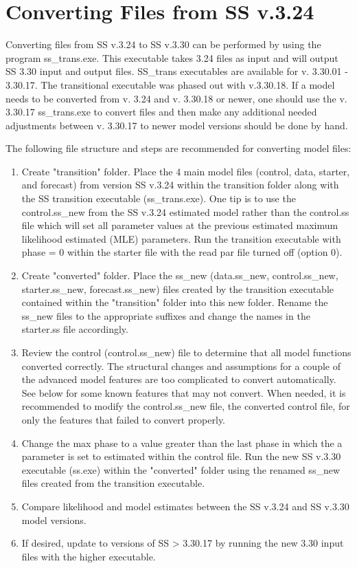 \hypertarget{ConvIssues}{}
\section{Converting Files from SS v.3.24}
Converting files from SS v.3.24 to SS v.3.30 can be performed by using the program ss\_trans.exe. This executable takes 3.24 files as input and will output SS 3.30 input and output files. SS\_trans executables are available for v. 3.30.01 - 3.30.17. The transitional executable was phased out with v.3.30.18. If a model needs to be converted from v. 3.24 and v. 3.30.18 or newer, one should use the v. 3.30.17 ss\_trans.exe to convert files and then make any additional needed adjustments between v. 3.30.17 to newer model versions should be done by hand.  

The following file structure and steps are recommended for converting model files:
\begin{enumerate}
	\item Create "transition" folder.  Place the 4 main model files (control, data, starter, and forecast) from version SS v.3.24 within the transition folder along with the SS transition executable (ss\_trans.exe).  One tip is to use the control.ss\_new from the SS v.3.24 estimated model rather than the control.ss file which will set all parameter values at the previous estimated maximum likelihood estimated (MLE) parameters.  Run the transition executable with phase = 0 within the starter file with the read par file turned off (option 0).
	
	\item Create "converted" folder.  Place the ss\_new (data.ss\_new, control.ss\_new, starter.ss\_new, forecast.ss\_new) files created by the transition executable contained within the "transition" folder into this new folder.  Rename the ss\_new files to the appropriate suffixes and change the names in the starter.ss file accordingly.
	
	\item Review the control (control.ss\_new) file to determine that all model functions converted correctly.  The structural changes and assumptions for a couple of the advanced model features are too complicated to convert automatically.  See below for some known features that may not convert. When needed, it is recommended to modify the control.ss\_new file, the converted control file, for only the features that failed to convert properly.
	
	\item Change the max phase to a value greater than the last phase in which the a parameter is set to estimated within the control file.  Run the new SS v.3.30 executable (ss.exe) within the "converted" folder using the renamed ss\_new files created from the transition executable.
	
	\item Compare likelihood and model estimates between the SS v.3.24 and SS v.3.30 model versions.
	
	\item If desired, update to versions of SS > 3.30.17 by running the new 3.30 input files with the higher executable.
\end{enumerate}


